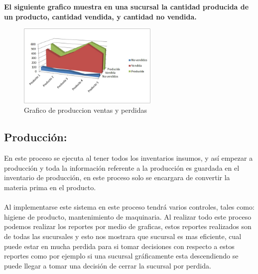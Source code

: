 \begin{itemize}
		\\%
		\\%
				\textbf{El siguiente grafico muestra en una sucursal la cantidad producida de un producto, cantidad vendida, y cantidad no vendida.}
\begin{figure}[htbp]
	\centering
		\includegraphics[width=0.60\textwidth]{images/Producidavendidaperdida.jpg}
	\caption{Grafico de produccion ventas y perdidas}
	\label{fig:Grafico de produccion ventas y perdidas}
\end{figure}%
%	
	\end{itemize}
	\subsection{Producci\'on:}En este proceso se ejecuta al tener todos los inventarios insumos, y así empezar a producci\'on y toda la informaci\'on referente a la producci\'on es guardada en el inventario de producci\'on, en este proceso solo se encargara de convertir la materia prima en el producto.	
\\%
\\%
Al implementarse este sistema en este proceso tendr\'a varios controles, tales como: higiene de producto, mantenimiento de maquinaria. Al realizar todo este proceso podemos realizar los reportes por medio de graficas, estos reportes realizados son de todas las sucursales y esto nos mostrara que sucursal es mas eficiente, cual puede estar en mucha perdida para si tomar decisiones con respecto a estos reportes como por ejemplo si una sucursal gr\'aficamente esta descendiendo se puede llegar a tomar una decisi\'on de cerrar la sucursal por perdida.
